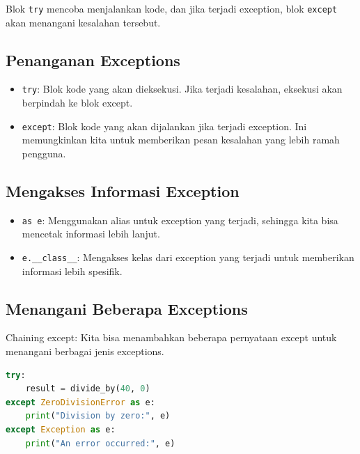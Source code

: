 \documentclass{article}
\begin{document}
Blok \verb|try| mencoba menjalankan kode, dan jika terjadi exception, blok \verb|except| akan menangani kesalahan tersebut.

\subsection{Penanganan Exceptions}
\begin{itemize}
    \item \verb|try|: Blok kode yang akan dieksekusi. Jika terjadi kesalahan, eksekusi akan berpindah ke blok except.
    \item \verb|except|: Blok kode yang akan dijalankan jika terjadi exception. Ini memungkinkan kita untuk memberikan pesan kesalahan yang lebih ramah pengguna.
\end{itemize}

\subsection{Mengakses Informasi Exception}
\begin{itemize}
    \item \verb|as e|: Menggunakan alias untuk exception yang terjadi, sehingga kita bisa mencetak informasi lebih lanjut.
    \item \verb|e.__class__|: Mengakses kelas dari exception yang terjadi untuk memberikan informasi lebih spesifik.
\end{itemize}

\subsection{Menangani Beberapa Exceptions}
Chaining except: Kita bisa menambahkan beberapa pernyataan except untuk menangani berbagai jenis exceptions.
\begin{lstlisting}[language=Python, caption={}, captionpos=b]
try:
    result = divide_by(40, 0)
except ZeroDivisionError as e:
    print("Division by zero:", e)
except Exception as e:
    print("An error occurred:", e)
\end{lstlisting}
\end{document}
